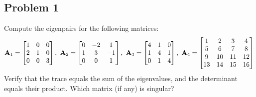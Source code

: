 \subsection{Problem 1}%
\label{sec:problem_1}
Compute the eigenpairs for the following matrices:
\begin{equation*}
    \matr{A}_1 = 
    \begin{bmatrix}
        1 & 0 & 0 \\
        2 & 1 & 0 \\
        0 & 0 & 3 
    \end{bmatrix},\ 
    \matr{A}_2 = 
    \begin{bmatrix}
        0 & -2 &  1 \\
        1 &  3 & -1 \\
        0 & 0 & 1 
    \end{bmatrix},\ 
    \matr{A}_3 = 
    \begin{bmatrix}
        4 & 1 & 0 \\
        1 & 4 & 1 \\
        0 & 1 & 4 
    \end{bmatrix},\ 
    \matr{A}_4 = 
    \begin{bmatrix}
         1 &  2 &  3 &  4 \\
         5 &  6 &  7 &  8 \\
         9 & 10 & 11 & 12 \\
        13 & 14 & 15 & 16
    \end{bmatrix}
\end{equation*}
Verify that the trace equals the sum of the eigenvalues, and the determinant equals
their product. Which matrix (if any) is singular?
